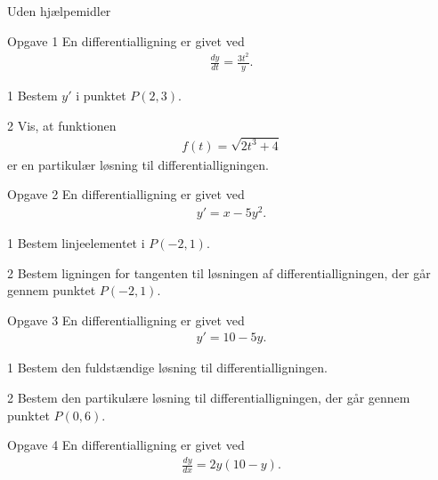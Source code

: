 
\begin{center}
	\LARGE
	Uden hjælpemidler
\end{center}
\begin{opgavetekst}{Opgave 1}
	En differentialligning er givet ved
	\begin{align*}
		\frac{dy}{dt} = \frac{3t^2}{y}.
	\end{align*}
\end{opgavetekst}
\begin{delopgave}{1}
	Bestem $y'$ i punktet $P(2,3)$.
\end{delopgave}
\begin{delopgave}{2}
	Vis, at funktionen
	\begin{align*}
		f(t) = \sqrt{2t^3 + 4}
	\end{align*}
	er en partikulær løsning til differentialligningen. 
\end{delopgave}
%
%
%
%
%
%
\begin{opgavetekst}{Opgave 2}
	En differentialligning er givet ved
	\begin{align*}
		y' = x - 5y^2.
	\end{align*}
\end{opgavetekst}
\begin{delopgave}{1}
	Bestem linjeelementet i $P(-2,1)$.	
\end{delopgave}
\begin{delopgave}{2}
	Bestem ligningen for tangenten til løsningen af differentialligningen, der går gennem punktet $P(-2,1)$.
\end{delopgave}
%
%
%
%
%
\begin{opgavetekst}{Opgave 3}
	En differentialligning er givet ved
	\begin{align*}
		y' = 10 - 5y.
	\end{align*}
\end{opgavetekst}
\begin{delopgave}{1}
	Bestem den fuldstændige løsning til differentialligningen.
\end{delopgave}
\begin{delopgave}{2}
	Bestem den partikulære løsning til differentialligningen, der går gennem punktet $P(0,6)$.
\end{delopgave}
%
%
%
%
%
\newpage
\begin{opgavetekst}{Opgave 4}
	En differentialligning er givet ved
	\begin{align*}
		\frac{dy}{dx} = 2y(10-y).
	\end{align*}
\end{opgavetekst}
